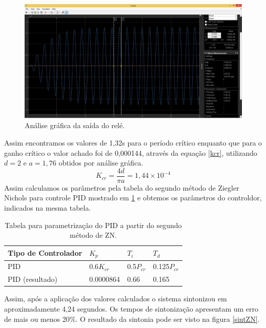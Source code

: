 \documentclass[article,12pt,oneside,a4paper,english,brazil,sumario=tradicional]{abntex2}
\begin{document}
\begin{figure}[H]
    \centering
    \includegraphics[scale=0.28]{rele.jpg}
    \caption{Análise gráfica da saída do relé.}
    \label{rele}
\end{figure}

Assim encontramos os valores de 1,32s para o período crítico  enquanto que para o ganho crítico o valor achado foi de 0,000144, através da equação \eqref{kcr}, utilizando $d=2$ e $a=1,76$ obtidos por análise gráfica. 
\begin{equation}
K_{cr}=\frac{4d}{\pi a}= 1,44 \times 10^{-4}
    \label{kcr}
\end{equation}
Assim calculamos os parâmetros pela tabela do segundo método de Ziegler Nichols para controle PID mostrado em \ref{ZN} e obtemos os parâmetros do controldor, indicados na mesma tabela. 

\begin{table}[H]
\centering
\caption{ Tabela para parametrização do PID a partir do segundo método de ZN.}
\begin{tabular}{|l|l|l|l|}
\hline
Tipo de Controlador  & $K_p$ & $T_i$ & $T_d$ \\\hline
PID & 0.6$K_{cr}$ & 0.5$P_{cr}$ & 0.125$P_{cr}$ \\\hline
PID (resultado) & 0.0000864 & 0.66 & 0.165\\\hline
\end{tabular}

\label{ZN}
\end{table}

Assim, após a aplicação dos valores calculados o sistema sintonizou em aproximadamente 4,24 segundos. Os tempos de sintonização apresentam um erro de mais ou menos 20$\%$. O resultado da sintonia pode ser visto na figura \ref{sintZN}.
\end{document}
